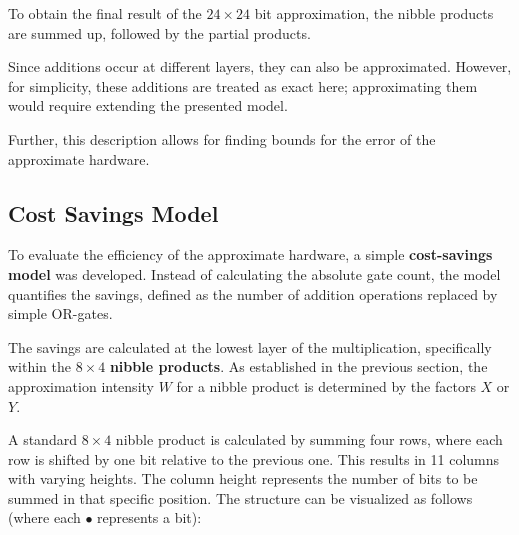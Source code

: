 \documentclass[a4paper,11pt]{article}
\begin{document}
To obtain the final result of the $24 \times 24$ bit approximation, the nibble products are summed up, followed by the partial products.

Since additions occur at different layers, they can also be approximated. However, for simplicity, these additions are treated as exact here; approximating them would require extending the presented model.

Further, this description allows for finding bounds for the error of the approximate hardware.

\subsection{Cost Savings Model}

To evaluate the efficiency of the approximate hardware, a simple \textbf{cost-savings model} was developed. Instead of calculating the absolute gate count, the model quantifies the savings, defined as the number of addition operations replaced by simple OR-gates.

The savings are calculated at the lowest layer of the multiplication, specifically within the $8 \times 4$ \textbf{nibble products}. As established in the previous section, the approximation intensity $W$ for a nibble product is determined by the factors $X$ or $Y$.

A standard $8 \times 4$ nibble product is calculated by summing four rows, where each row is shifted by one bit relative to the previous one. This results in 11 columns with varying heights. The column height represents the number of bits to be summed in that specific position. The structure can be visualized as follows (where each $\bullet$ represents a bit):
\end{document}
